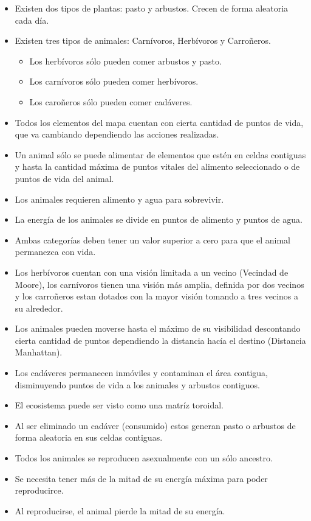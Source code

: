   \begin{itemize}
    \item{Existen dos tipos de plantas: pasto y arbustos. Crecen de forma aleatoria cada día.}
    \item{Existen tres tipos de animales: Carnívoros, Herbívoros y Carroñeros.}
      \begin{itemize}
        \item{Los herbívoros sólo pueden comer arbustos y pasto.}
        \item{Los carnívoros sólo pueden comer herbívoros.}
        \item{Los caroñeros sólo pueden comer cadáveres.}
      \end{itemize}
    \item{Todos los elementos del mapa cuentan con cierta cantidad de puntos de vida, que va cambiando dependiendo las acciones realizadas.}
    \item{Un animal sólo se puede alimentar de elementos que estén en celdas contiguas y hasta la cantidad máxima de puntos vitales del alimento seleccionado o de puntos de vida del animal.}
    \item{Los animales requieren alimento y agua para sobrevivir.}
    \item{La energía de los animales se divide en puntos de alimento y puntos de agua.}
    \item{Ambas categorías deben tener un valor superior a cero para que el animal permanezca con vida.}
    \item{Los herbívoros cuentan con una visión limitada a un vecino (Vecindad de Moore), los carnívoros tienen una visión más amplia, definida por dos vecinos y los carroñeros estan dotados con la mayor visión tomando a tres vecinos a su alrededor.}
    \item{Los animales pueden moverse hasta el máximo de su visibilidad descontando cierta cantidad de puntos dependiendo la distancia hacía el destino (Distancia Manhattan).}
    \item{Los cadáveres permanecen inmóviles y contaminan el área contigua, disminuyendo puntos de vida a los animales y arbustos contiguos.}
    \item{El ecosistema puede ser visto como una matríz toroidal.}
    \item{Al ser eliminado un cadáver (consumido) estos generan pasto o arbustos de forma aleatoria en sus celdas contiguas.}
    \item{Todos los animales se reproducen asexualmente con un sólo ancestro.}
    \item{Se necesita tener más de la mitad de su energía máxima para poder reproducirce.}
    \item{Al reproducirse, el animal pierde la mitad de su energía.}
  \end{itemize}
  
